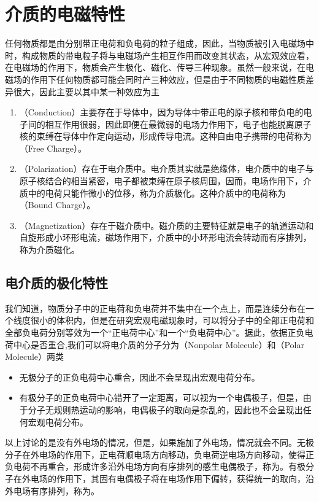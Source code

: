 \section{介质的电磁特性}
任何物质都是由分别带正电荷和负电荷的粒子组成，因此，当物质被引入电磁场中时，构成物质的带电粒子将与电磁场产生相互作用而改变其状态，从宏观效应看，在电磁场的作用下，物质会产生极化、磁化、传导三种现象。虽然一般来说，在电磁场的作用下任何物质都可能会同时产三种效应，但是由于不同物质的电磁性质差异很大，因此主要以其中某一种效应为主
\begin{enumerate}
    \item {}（Conduction）主要存在于导体中，因为导体中带正电的原子核和带负电的电子间的相互作用很弱，因此即便在最微弱的电场力作用下，电子也能脱离原子核的束缚在导体中作定向运动，形成传导电流。这种自由电子携带的电荷称为（Free Charge）。
    \item {}（Polarization）存在于电介质中。电介质其实就是绝缘体，电介质中的电子与原子核结合的相当紧密，电子都被束缚在原子核周围，因而，电场作用下，介质中的电荷只能作微小的位移，称为介质极化。这种介质中的电荷称为（Bound Charge）。
    \item {}（Magnetization）存在于磁介质中。磁介质的主要特征就是电子的轨道运动和自旋形成小环形电流，磁场作用下，介质中的小环形电流会转动而有序排列，称为介质磁化。
\end{enumerate}


\subsection{电介质的极化特性}
我们知道，物质分子中的正电荷和负电荷并不集中在一个点上，而是连续分布在一个线度很小的体积内，但是在研究宏观电磁现象时，可以将分子中的全部正电荷和全部负电荷分别等效为一个“正电荷中心”和一个“负电荷中心”。据此，依据正负电荷中心是否重合,我们可以将电介质的分子分为（Nonpolar Molecule）和（Polar Molecule）两类
\begin{itemize}
    \item 无极分子的正负电荷中心重合，因此不会呈现出宏观电荷分布。
    \item 有极分子的正负电荷中心错开了一定距离，可以视为一个电偶极子，但是，由于分子无规则热运动的影响，电偶极子的取向是杂乱的，因此也不会呈现出任何宏观电荷分布。
\end{itemize}

以上讨论的是没有外电场的情况，但是，如果施加了外电场，情况就会不同。无极分子在外电场的作用下，正电荷顺电场方向移动，负电荷逆电场方向移动，使得正负电荷不再重合，形成许多沿外电场方向有序排列的感生电偶极子，称为。有极分子在外电场的作用下，其固有电偶极子将在电场作用下偏转，获得统一的取向，沿外电场有序排列，称为。

